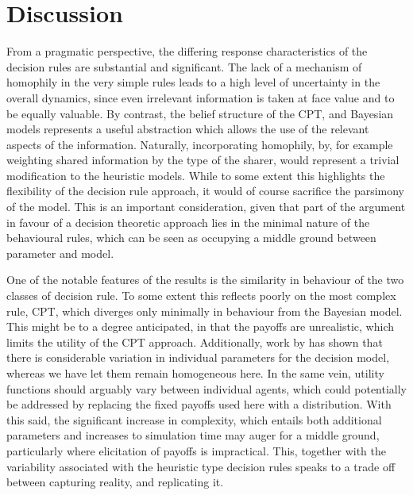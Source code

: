 \section{Discussion}
\label{sec:discussion}
%

From a pragmatic perspective, the differing response characteristics of the decision rules are substantial and significant. The lack of a mechanism of homophily in the very simple rules leads to a high level of uncertainty in the overall dynamics, since even irrelevant information is taken at face value and to be equally valuable. By contrast, the belief structure of the \ac{CPT}, and Bayesian models represents a useful abstraction which allows the use of the relevant aspects of the information.  Naturally, incorporating homophily, by, for example weighting shared information by the type of the sharer, would represent a trivial modification to the heuristic models. While to some extent this highlights the flexibility of the decision rule approach, it would of course sacrifice the parsimony of the model. This is an important consideration, given that part of the argument in favour of a decision theoretic approach lies in the minimal nature of the behavioural rules, which can be seen as occupying a middle ground between parameter and model.

One of the notable features of the results is the similarity in behaviour of the two classes of decision rule. To some extent this reflects poorly on the most complex rule, \ac{CPT}, which diverges only minimally in behaviour from the Bayesian model. This might be to a degree anticipated, in that the payoffs are unrealistic, which limits the utility of the \ac{CPT} approach.  Additionally, work by \citet{Glockner2012} has shown that there is considerable variation in individual parameters for the decision model, whereas we have let them remain homogeneous here. In the same vein, utility functions should arguably vary between individual agents, which could potentially be addressed by replacing the fixed payoffs used here with a distribution.  With this said, the significant increase in complexity, which entails both additional parameters and increases to simulation time may auger for a middle ground, particularly where elicitation of payoffs is impractical.  This, together with the variability associated with the heuristic type decision rules speaks to a trade off between capturing reality, and replicating it.


